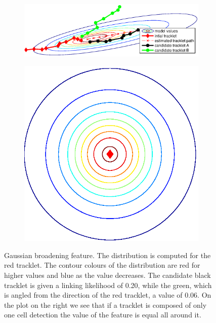 			\begin{figure}[h]
				\begin{subfigure}{.78\textwidth}
				  \includegraphics[width=\textwidth]{images/fig_gaussianbroadening1}
				\end{subfigure}%
				\hfill
				\begin{subfigure}{.2\textwidth}
				  \includegraphics[width=\textwidth]{images/fig_gaussianbroadening2}
				\end{subfigure}
				\caption{Gaussian broadening feature. The distribution is computed for the red tracklet. The contour colours of the distribution are red for higher values and blue as the value decreases. The candidate black tracklet is given a linking likelihood of 0.20, while the green, which is angled from the direction of the red tracklet, a value of 0.06. On the plot on the right we see that if a tracklet is composed of only one cell detection the value of the feature is equal all around it.}
				\label{fig:gaussianbroadening}
			\end{figure}

